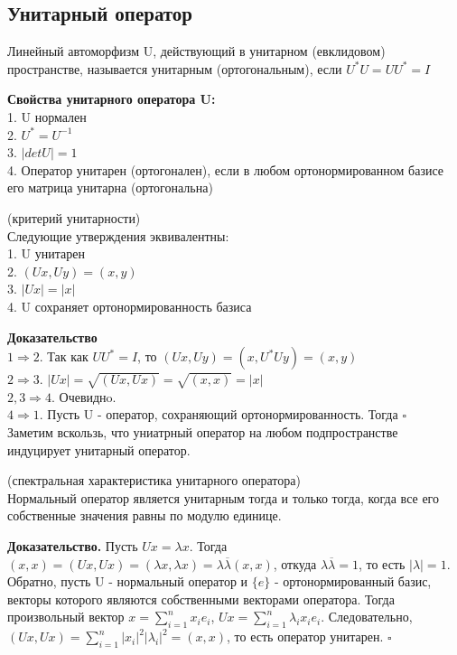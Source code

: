 \subsection{Унитарный оператор}
\begin{defin}
Линейный автоморфизм U, действующий в унитарном (евклидовом) пространстве,
называется унитарным (ортогональным), если $U^*U=UU^*=I$
\end{defin}
\textbf{Свойства унитарного оператора U:}\\
1. U нормален\\
2. $U^*=U^{-1}$\\
3. $|detU|=1$\\
4. Оператор унитарен (ортогонален), если в любом ортонормированном базисе его
матрица унитарна (ортогональна)
\begin{theor}(критерий унитарности)\\
Следующие утверждения эквивалентны:\\
1. U унитарен\\
2. $(Ux,Uy)=(x,y)$\\
3. $|Ux|=|x|$\\
4. U сохраняет ортонормированность базиса
\end{theor}
\textbf{Доказательство}\\
$1\Rightarrow2$. Так как $UU^*=I$, то $(Ux,Uy)=(x,U^*Uy)=(x,y)$\\
$2\Rightarrow3$. $|Ux|=\sqrt{(Ux,Ux)}=\sqrt{(x,x)}=|x|$\\
$2,3\Rightarrow4$. Очевиднo.\\
$4\Rightarrow1$. Пусть U - оператор, сохраняющий ортонормированность. Тогда
$\square$ \\
Заметим вскользь, что униатрный оператор на любом подпространстве индуцирует
унитарный оператор. 
\begin{theor}\label{specharortop}(спектральная характеристика унитарного 
		оператора)\\
Нормальный оператор является унитарным тогда и только тогда, когда все его
собственные значения равны по модулю единице.
\end{theor}
\textbf{Доказательство.} Пусть $Ux=\lambda x$. 
Тогда $(x,x)=(Ux,Ux)=(\lambda x,\lambda x)=\lambda\overline\lambda(x,x)$,
откуда $\lambda\overline\lambda=1$, 
то есть $|\lambda|=1$.\\
Обратно, пусть U - нормальный оператор и $\{e\}$ - ортонормированный базис,
векторы которого являются собственными векторами оператора.
Тогда произвольный вектор $x=\sum\limits^{n}_{i=1}x_ie_i$,
$Ux=\sum\limits^{n}_{i=1}\lambda_ix_ie_i$.
Следовательно, $(Ux,Ux)=\sum\limits^{n}_{i=1}|x_i|^2|\lambda_i|^2=(x,x)$, то
есть оператор унитарен. $\square$
